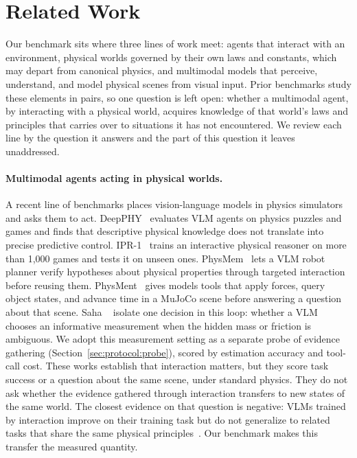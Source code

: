 \section{Related Work}
\label{sec:related}

Our benchmark sits where three lines of work meet: agents that interact with an environment, physical worlds governed by their own laws and constants, which may depart from canonical physics, and multimodal models that perceive, understand, and model physical scenes from visual input. Prior benchmarks study these elements in pairs, so one question is left open: whether a multimodal agent, by interacting with a physical world, acquires knowledge of that world's laws and principles that carries over to situations it has not encountered. We review each line by the question it answers and the part of this question it leaves unaddressed.

\paragraph{Multimodal agents acting in physical worlds.} A recent line of benchmarks places vision-language models in physics simulators and asks them to act. DeepPHY~\cite{deepphy} evaluates VLM agents on physics puzzles and games and finds that descriptive physical knowledge does not translate into precise predictive control. IPR-1~\cite{ipr1} trains an interactive physical reasoner on more than 1,000 games and tests it on unseen ones. PhysMem~\cite{physmem} lets a VLM robot planner verify hypotheses about physical properties through targeted interaction before reusing them. PhysMent~\cite{physment} gives models tools that apply forces, query object states, and advance time in a MuJoCo scene before answering a question about that scene. Saha \etal~\cite{newevidence} isolate one decision in this loop: whether a VLM chooses an informative measurement when the hidden mass or friction is ambiguous. We adopt this measurement setting as a separate probe of evidence gathering (Section~\ref{sec:protocol:probe}), scored by estimation accuracy and tool-call cost. These works establish that interaction matters, but they score task success or a question about the same scene, under standard physics. They do not ask whether the evidence gathered through interaction transfers to new states of the same world. The closest evidence on that question is negative: VLMs trained by interaction improve on their training task but do not generalize to related tasks that share the same physical principles~\cite{schulzebuschoff2026}. Our benchmark makes this transfer the measured quantity.

